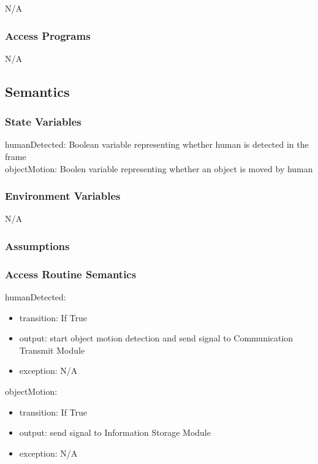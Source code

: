 \documentclass[12pt, titlepage]{article}
\begin{document}
N/A

\subsubsection{Access Programs}

N/A

\subsection{Semantics}

\subsubsection{State Variables}

humanDetected: Boolean variable representing whether human is detected in the frame \\
objectMotion: Boolen variable representing whether an object is moved by human


\subsubsection{Environment Variables}

N/A


\subsubsection{Assumptions}


\subsubsection{Access Routine Semantics}

\noindent humanDetected:
\begin{itemize}
\item transition: If True 
\item output: start object motion detection and send signal to Communication Transmit Module
\item exception: N/A
\end{itemize}
\noindent objectMotion:
\begin{itemize}
\item transition: If True 
\item output: send signal to Information Storage Module 
\item exception: N/A
\end{itemize}
\end{document}
